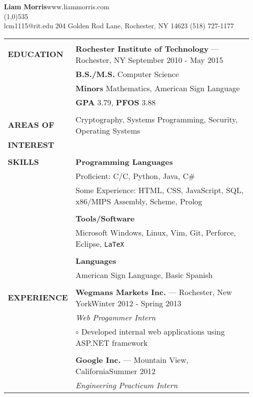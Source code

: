 \documentclass[11pt,letterpaper]{article}
\newcommand{\CPP}
{C\nolinebreak[4]\hspace{-.05em}\raisebox{.22ex}{\footnotesize\bf ++}}
\begin{document}
\raggedright

\textbf{\huge{Liam Morris}}\hfill www.liammorris.com\\
\vspace{-8pt}
\line(1,0){535}\\
lcm1115@rit.edu \hfill 204 Golden Rod Lane, Rochester, NY 14623 \hfill (518)
727-1177\\
\vspace{5pt}

\begin{tabular}{@{}lp{6.2in}}
&\\
\textbf{EDUCATION}
&\textbf{Rochester Institute of Technology} --- Rochester, NY \hfill September 2010 - May 2015\\
&\textbf{B.S./M.S.} Computer Science\\
&\textbf{Minors} Mathematics, American Sign Language\\
&\textbf{GPA} 3.79, \textbf{PFOS} 3.88\\
&\\
\textbf{AREAS OF}
&Cryptography, Systems Programming, Security, Operating Systems\\
\textbf{INTEREST}&\\
&\\
\textbf{SKILLS}
&\textbf{Programming Languages}\\
&Proficient: C/\CPP, Python, Java, C\#\\
&Some Experience: HTML, CSS, JavaScript, SQL, x86/MIPS Assembly, Scheme, Prolog\\
&\\
&\textbf{Tools/Software}\\
&Microsoft Windows, Linux, Vim, Git, Perforce, Eclipse, \texttt{\LaTeX}\\
&\\
&\textbf{Languages}\\
&American Sign Language, Basic Spanish\\
&\\
\textbf{EXPERIENCE}
&\textbf{Wegmans Markets Inc.} --- Rochester, New York\hfill Winter 2012 - Spring 2013\\
&\emph{Web Progammer Intern}\\
&\hspace{10pt}$\circ$ Developed internal web applications using ASP.NET framework\\
&\\
&\textbf{Google Inc.} --- Mountain View, California\hfill Summer 2012\\
&\emph{Engineering Practicum Intern}\\

\end{tabular}
\end{document}
